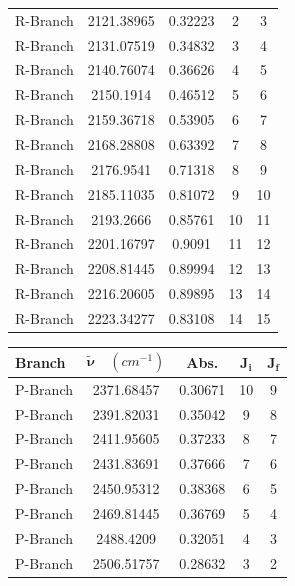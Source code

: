 \documentclass[titlepage]{article}
\begin{document}
\begin{figure}[htbp]
\begin{minipage}[t]{0.48\textwidth}
\begin{tabular}{|l|c|c|c|c|}
        R-Branch & 2121.38965 & 0.32223 & 2 & 3 \\ 
        R-Branch & 2131.07519 & 0.34832 & 3 & 4 \\ 
        R-Branch & 2140.76074 & 0.36626 & 4 & 5 \\ 
        R-Branch & 2150.1914 & 0.46512 & 5 & 6 \\ 
        R-Branch & 2159.36718 & 0.53905 & 6 & 7 \\ 
        R-Branch & 2168.28808 & 0.63392 & 7 & 8 \\ 
        R-Branch & 2176.9541 & 0.71318 & 8 & 9 \\ 
        R-Branch & 2185.11035 & 0.81072 & 9 & 10 \\ 
        R-Branch & 2193.2666 & 0.85761 & 10 & 11 \\ 
        R-Branch & 2201.16797 & 0.9091 & 11 & 12 \\ 
        R-Branch & 2208.81445 & 0.89994 & 12 & 13 \\ 
        R-Branch & 2216.20605 & 0.89895 & 13 & 14 \\ 
        R-Branch & 2223.34277 & 0.83108 & 14 & 15 \\ \hline
        \end{tabular}
        \label{tab:dcl}
    \end{minipage}
    \vspace{4mm}
    \begin{minipage}[t]{0.48\textwidth}
        \centering
        \begin{tabular}{|l|c|c|c|c|}
        \hline
        \textbf{Branch} & \(\mathbf{\tilde{\nu}} \quad \left(cm^{-1}\right)\) 
        & \textbf{Abs.} & \(\mathbf{J_i}\) & \(\mathbf{J_f}\) \\ \hline
        P-Branch & 2371.68457 & 0.30671 & 10 & 9 \\ 
        P-Branch & 2391.82031 & 0.35042 & 9 & 8 \\ 
        P-Branch & 2411.95605 & 0.37233 & 8 & 7 \\ 
        P-Branch & 2431.83691 & 0.37666 & 7 & 6 \\ 
        P-Branch & 2450.95312 & 0.38368 & 6 & 5 \\ 
        P-Branch & 2469.81445 & 0.36769 & 5 & 4 \\ 
        P-Branch & 2488.4209 & 0.32051 & 4 & 3 \\ 
        P-Branch & 2506.51757 & 0.28632 & 3 & 2 \\ 

\end{tabular}
\end{minipage}
\end{figure}
\end{document}
